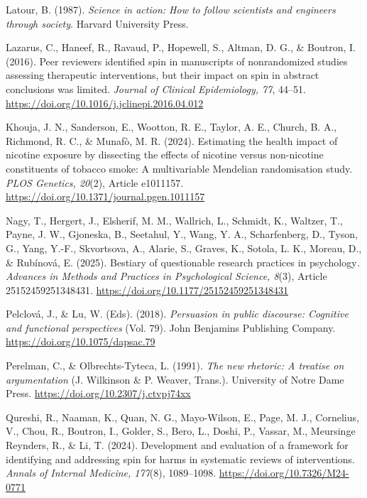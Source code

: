 \documentclass[authordate, meta]{jote-new-article}
\begin{document}
	Latour, B. (1987). \emph{Science in action: How to follow scientists and engineers through society}. Harvard University Press.



	Lazarus, C., Haneef, R., Ravaud, P., Hopewell, S., Altman, D. G., \& Boutron, I. (2016). Peer reviewers identified spin in manuscripts of nonrandomized studies assessing therapeutic interventions, but their impact on spin in abstract conclusions was limited. \emph{Journal of Clinical Epidemiology, 77}, 44--51. \url{https://doi.org/10.1016/j.jclinepi.2016.04.012}



	Khouja, J. N., Sanderson, E., Wootton, R. E., Taylor, A. E., Church, B. A., Richmond, R. C., \& Munafò, M. R. (2024). Estimating the health impact of nicotine exposure by dissecting the effects of nicotine versus non-nicotine constituents of tobacco smoke: A multivariable Mendelian randomisation study. \emph{PLOS Genetics, 20}(2), Article e1011157. \url{https://doi.org/10.1371/journal.pgen.1011157}



	Nagy, T., Hergert, J., Elsherif, M. M., Wallrich, L., Schmidt, K., Waltzer, T., Payne, J. W., Gjoneska, B., Seetahul, Y., Wang, Y. A., Scharfenberg, D., Tyson, G., Yang, Y.-F., Skvortsova, A., Alarie, S., Graves, K., Sotola, L. K., Moreau, D., \& Rubínová, E. (2025). Bestiary of questionable research practices in psychology\emph{. Advances in Methods and Practices in Psychological Science, 8}(3), Article 25152459251348431. \url{https://doi.org/10.1177/25152459251348431}



	Pelclová, J., \& Lu, W. (Eds). (2018). \emph{Persuasion in public discourse: Cognitive and functional perspectives }(Vol. 79). John Benjamins Publishing Company. \url{https://doi.org/10.1075/dapsac.79}



	Perelman, C., \& Olbrechts-Tyteca, L. (1991). \emph{The new rhetoric: A treatise on argumentation} (J. Wilkinson \& P. Weaver, Trans.). University of Notre Dame Press. \url{https://doi.org/10.2307/j.ctvpj74xx}



	Qureshi, R., Naaman, K., Quan, N. G., Mayo-Wilson, E., Page, M. J., Cornelius, V., Chou, R., Boutron, I., Golder, S., Bero, L., Doshi, P., Vassar, M., Meursinge Reynders, R., \& Li, T. (2024). Development and evaluation of a framework for identifying and addressing spin for harms in systematic reviews of interventions. \emph{Annals of Internal Medicine, 177}(8), 1089--1098. \url{https://doi.org/10.7326/M24-0771}
\end{document}

